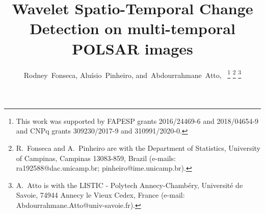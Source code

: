 \documentclass[journal]{IEEEtran}
\begin{document}
%
\title{Wavelet Spatio-Temporal Change Detection on multi-temporal POLSAR images}
%
%
%

\author{Rodney~Fonseca,
        Alu\'{i}sio~Pinheiro,
        and~Abdourrahmane~Atto,~%
\thanks{This work was supported by FAPESP grants 2016/24469-6 and 2018/04654-9 and CNPq grants 309230/2017-9 and 310991/2020-0.}
\thanks{R.~Fonseca and A.~Pinheiro are with the Department of Statistics, University of Campinas, Campinas 13083-859, Brazil (e-mails: ra192588@dac.unicamp.br; pinheiro@ime.unicamp.br).}
\thanks{A.~Atto is with the LISTIC - Polytech Annecy-Chamb\'{e}ry, Universit\'{e} de Savoie, 74944 Annecy le Vieux Cedex, France (e-mail: Abdourrahmane.Atto@univ-savoie.fr).}}

% 
%
\end{document}
